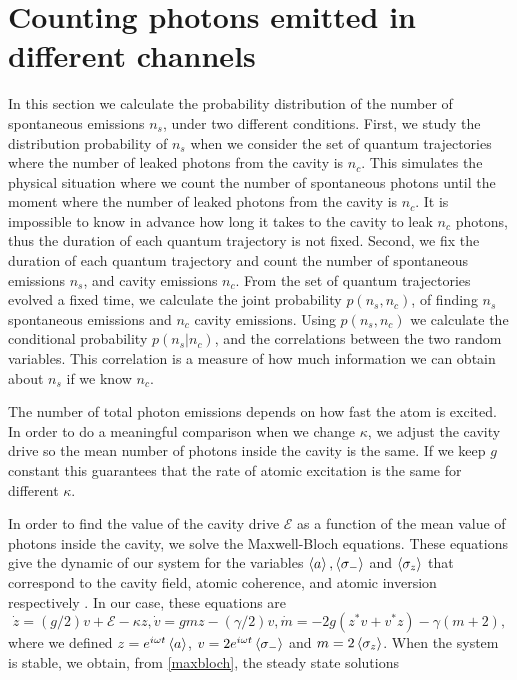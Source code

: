 \documentclass[%
 reprint,
 amsmath,amssymb,
 aps, 
]{revtex4-1}
\begin{document}
\section{Counting photons emitted in different channels}\label{sc:distributions}
In this section we calculate the probability distribution of the
number of spontaneous emissions $n_s$, under two different conditions.
First, we study the distribution probability of $n_s$ when we consider
the set of quantum trajectories where the number of leaked photons
from the cavity is $n_c$. This simulates the physical situation where
we count the number of spontaneous photons until the moment where the
number of leaked photons from the cavity is $n_c$. It is impossible to
know in advance how long it takes to the cavity to leak $n_c$ photons,
thus the duration of each quantum trajectory is not fixed. Second, we
fix the duration of each quantum trajectory and count the number of
spontaneous emissions $n_s$, and cavity emissions $n_c$. From the set
of quantum trajectories evolved a fixed time, we calculate the joint
probability $p(n_s,n_c)$, of finding $n_s$ spontaneous emissions and
$n_c$ cavity emissions. Using $p(n_s,n_c)$ we calculate the
conditional probability $p(n_s|n_c)$, and the correlations between the
two random variables. This correlation is a measure of how much
information we can obtain about $n_s$ if we know $n_c$.

The number of total photon emissions depends on how fast the atom is
excited. In order to do a meaningful comparison when we change
$\kappa$, we adjust the cavity drive so the mean number of photons
inside the cavity is the same. If we keep $g$ constant this guarantees
that the rate of atomic excitation is the same for different $\kappa$.

In order to find the value of the cavity drive $\mathcal{E}$ as a
function of the mean value of photons inside the cavity, we solve the
Maxwell-Bloch equations. These equations give the dynamic of our
system for the variables $\expval{a}, \expval{\sigma_-}$ and
$\expval{\sigma_z}$ that correspond to the cavity field, atomic
coherence, and atomic inversion respectively \cite{Alsing_1991}. In
our case, these equations are
\begin{subequations} \label{maxbloch}
\begin{equation} \label{bloch1}
\dot{z} = (g/2)v + \mathcal{E} - \kappa z,
\end{equation}
\begin{equation} \label{bloch2}
\dot{v} = gmz - (\gamma/2)v,
\end{equation}
\begin{equation} \label{bloch3}
\dot{m} = -2g(z^*v + v^*z) - \gamma(m + 2),
\end{equation}
\end{subequations} 
where we defined $z = e^{i\omega t}\expval{a}$,
$v = 2e^{i\omega t}\expval{\sigma_-}$ and $m = 2\expval{\sigma_z}$.
When the system is stable, we obtain, from
\eqref{maxbloch}, the steady state
solutions \cite{gagniuc2017markov}
\end{document}

